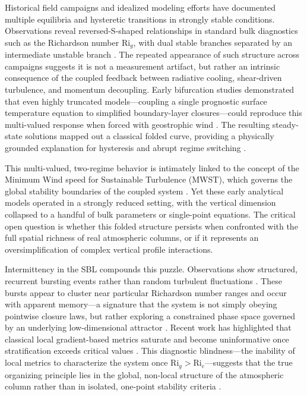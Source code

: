 \documentclass[12pt,a4paper]{article}
\newcommand{\Ric}{\mathrm{Ri}_c}
\newcommand{\Rig}{\mathrm{Ri}_g}
\begin{document}
Historical field campaigns and idealized modeling efforts have documented multiple equilibria and hysteretic transitions in strongly stable conditions. Observations reveal reversed-S-shaped relationships in standard bulk diagnostics such as the Richardson number $\Rig$, with dual stable branches separated by an intermediate unstable branch \citep{mcnider1993, mcnider1995}. The repeated appearance of such structure across campaigns suggests it is not a measurement artifact, but rather an intrinsic consequence of the coupled feedback between radiative cooling, shear-driven turbulence, and momentum decoupling. Early bifurcation studies demonstrated that even highly truncated models---coupling a single prognostic surface temperature equation to simplified boundary-layer closures---could reproduce this multi-valued response when forced with geostrophic wind \citep{shirer1980}. The resulting steady-state solutions mapped out a classical folded curve, providing a physically grounded explanation for hysteresis and abrupt regime switching \citep{mcnider1995, biazar1995}.

This multi-valued, two-regime behavior is intimately linked to the concept of the Minimum Wind speed for Sustainable Turbulence (MWST), which governs the global stability boundaries of the coupled system \citep{vandewiel2017, vignon2017}. Yet these early analytical models operated in a strongly reduced setting, with the vertical dimension collapsed to a handful of bulk parameters or single-point equations. The critical open question is whether this folded structure persists when confronted with the full spatial richness of real atmospheric columns, or if it represents an oversimplification of complex vertical profile interactions.

Intermittency in the SBL compounds this puzzle. Observations show structured, recurrent bursting events rather than random turbulent fluctuations \citep{acevedo2001}. These bursts appear to cluster near particular Richardson number ranges and occur with apparent memory—a signature that the system is not simply obeying pointwise closure laws, but rather exploring a constrained phase space governed by an underlying low-dimensional attractor \citep{poveda1993}. Recent work has highlighted that classical local gradient-based metrics saturate and become uninformative once stratification exceeds critical values \citep{vandewiel2017}. This diagnostic blindness—the inability of local metrics to characterize the system once $\Rig > \Ric$—suggests that the true organizing principle lies in the global, non-local structure of the atmospheric column rather than in isolated, one-point stability criteria \citep{derbyshire1999}.
\end{document}
